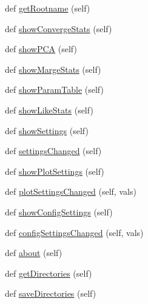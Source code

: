 \begin{DoxyCompactItemize}
\item 
def \mbox{\hyperlink{classgetdist_1_1gui_1_1mainwindow_1_1MainWindow_addbd3bf89b07a5176f3daad52ada42c9}{get\+Rootname}} (self)
\item 
def \mbox{\hyperlink{classgetdist_1_1gui_1_1mainwindow_1_1MainWindow_a4c0ed0535d70f1a3587c83d3ab38465e}{show\+Converge\+Stats}} (self)
\item 
def \mbox{\hyperlink{classgetdist_1_1gui_1_1mainwindow_1_1MainWindow_a2ce9349444008527443bc8891a5b8a44}{show\+P\+CA}} (self)
\item 
def \mbox{\hyperlink{classgetdist_1_1gui_1_1mainwindow_1_1MainWindow_ab2bfcd95456dc31098dd7aeb11530a09}{show\+Marge\+Stats}} (self)
\item 
def \mbox{\hyperlink{classgetdist_1_1gui_1_1mainwindow_1_1MainWindow_add82606cde0404943c1e1030451e586c}{show\+Param\+Table}} (self)
\item 
def \mbox{\hyperlink{classgetdist_1_1gui_1_1mainwindow_1_1MainWindow_a91b3c81902c45328fe0fa805ba6f06c3}{show\+Like\+Stats}} (self)
\item 
def \mbox{\hyperlink{classgetdist_1_1gui_1_1mainwindow_1_1MainWindow_a89746f2bf22edf5fb8fbb10e586b378f}{show\+Settings}} (self)
\item 
def \mbox{\hyperlink{classgetdist_1_1gui_1_1mainwindow_1_1MainWindow_ac0c692080d7ff6956628ce458bea4c6b}{settings\+Changed}} (self)
\item 
def \mbox{\hyperlink{classgetdist_1_1gui_1_1mainwindow_1_1MainWindow_aad177b33d62234497a50dea1e81f5401}{show\+Plot\+Settings}} (self)
\item 
def \mbox{\hyperlink{classgetdist_1_1gui_1_1mainwindow_1_1MainWindow_ab2251d26d381d446a19a21de18bcb7dd}{plot\+Settings\+Changed}} (self, vals)
\item 
def \mbox{\hyperlink{classgetdist_1_1gui_1_1mainwindow_1_1MainWindow_a27ed85036d6f1e23f974058c03a687e9}{show\+Config\+Settings}} (self)
\item 
def \mbox{\hyperlink{classgetdist_1_1gui_1_1mainwindow_1_1MainWindow_aa3137337c73a0bfeb5a754e3a418797e}{config\+Settings\+Changed}} (self, vals)
\item 
def \mbox{\hyperlink{classgetdist_1_1gui_1_1mainwindow_1_1MainWindow_a8939fab5efd75328433f70cb035edb0a}{about}} (self)
\item 
def \mbox{\hyperlink{classgetdist_1_1gui_1_1mainwindow_1_1MainWindow_aa0388a3f86e2f94a313715182b9cc2ac}{get\+Directories}} (self)
\item 
def \mbox{\hyperlink{classgetdist_1_1gui_1_1mainwindow_1_1MainWindow_ad54b990be48269b8e9375dac2a68ee9c}{save\+Directories}} (self)

\end{DoxyCompactItemize}
